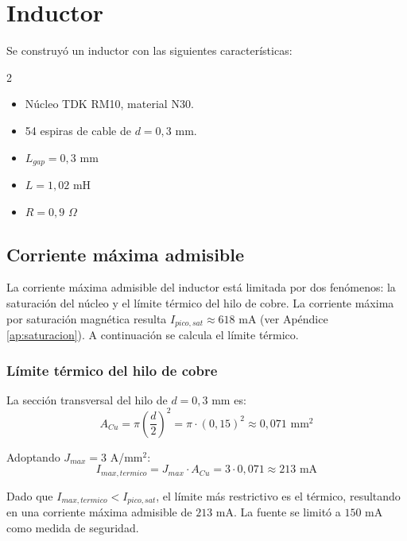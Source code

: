 \section{Inductor}
Se construyó un inductor con las siguientes características:
\begin{multicols}{2}
\begin{itemize}
    \setlength{\itemsep}{0pt} %
    \setlength{\parskip}{0pt}
    \item Núcleo TDK RM10, material N30.
    \item 54 espiras de cable de $d = 0,3$ mm.
    \item $L_{gap} = 0,3$ mm
    \item $L = 1,02$ mH
    \item $R = 0,9$ $\Omega$
\end{itemize}
\end{multicols}

\subsection{Corriente máxima admisible}

La corriente máxima admisible del inductor está limitada por dos fenómenos: la saturación del núcleo y el límite térmico del hilo de cobre. La corriente máxima por saturación magnética resulta $I_{pico,sat} \approx 618$ mA (ver Apéndice \ref{ap:saturacion}). A continuación se calcula el límite térmico.

\subsubsection{Límite térmico del hilo de cobre}

La sección transversal del hilo de $d = 0,3$ mm es:
\begin{equation}
    A_{Cu} = \pi \left(\frac{d}{2}\right)^2 = \pi \cdot (0,15)^2 \approx 0,071 \text{ mm}^2
    \label{eq:seccion}
\end{equation}

Adoptando $J_{max} = 3$ A/mm$^2$:
\begin{equation}
    I_{max,termico} = J_{max} \cdot A_{Cu} = 3 \cdot 0,071 \approx 213 \text{ mA}
    \label{eq:itermico}
\end{equation}

Dado que $I_{max,termico} < I_{pico,sat}$, el límite más restrictivo es el térmico, resultando en una corriente máxima admisible de $213$ mA. La fuente se limitó a $150$ mA como medida de seguridad.